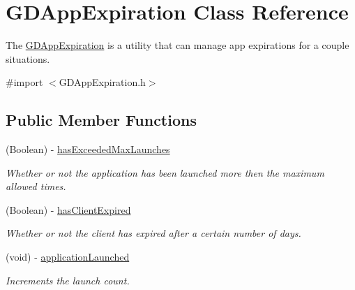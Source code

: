 \hypertarget{interface_g_d_app_expiration}{
\section{GDAppExpiration Class Reference}
\label{interface_g_d_app_expiration}
}


The \hyperlink{interface_g_d_app_expiration}{GDAppExpiration} is a utility that can manage app expirations for a couple situations.  


{\ttfamily \#import $<$GDAppExpiration.h$>$}\subsection*{Public Member Functions}
\begin{DoxyCompactItemize}
\item 
\hypertarget{interface_g_d_app_expiration_aac7c6e13809353b9af00da775cc3b98e}{
(Boolean) -\/ \hyperlink{interface_g_d_app_expiration_aac7c6e13809353b9af00da775cc3b98e}{hasExceededMaxLaunches}}
\label{interface_g_d_app_expiration_aac7c6e13809353b9af00da775cc3b98e}

\begin{DoxyCompactList}\small\item\em Whether or not the application has been launched more then the maximum allowed times. \item\end{DoxyCompactList}\item 
\hypertarget{interface_g_d_app_expiration_aa96390cb48868a64b0fc3748e2d1c7e3}{
(Boolean) -\/ \hyperlink{interface_g_d_app_expiration_aa96390cb48868a64b0fc3748e2d1c7e3}{hasClientExpired}}
\label{interface_g_d_app_expiration_aa96390cb48868a64b0fc3748e2d1c7e3}

\begin{DoxyCompactList}\small\item\em Whether or not the client has expired after a certain number of days. \item\end{DoxyCompactList}\item 
\hypertarget{interface_g_d_app_expiration_ad3ed743ed4d283f1c681e57b8ea9d3ab}{
(void) -\/ \hyperlink{interface_g_d_app_expiration_ad3ed743ed4d283f1c681e57b8ea9d3ab}{applicationLaunched}}
\label{interface_g_d_app_expiration_ad3ed743ed4d283f1c681e57b8ea9d3ab}

\begin{DoxyCompactList}\small\item\em Increments the launch count. \item\end{DoxyCompactList}\end{DoxyCompactItemize}
